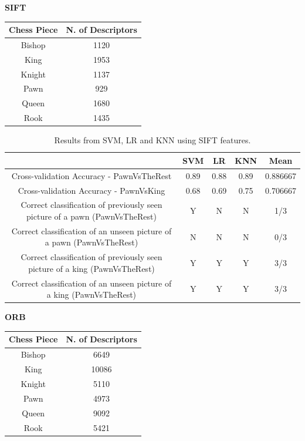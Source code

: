 \documentclass{l4proj}
\begin{document}
\begin{table}[h!] \label{SIFTTable1}
	\centering
	\textbf{SIFT}
	
	\vspace{2mm}
	\begin{tabular}{|c|c|}
	\hline
	Chess Piece & N. of Descriptors  \\
	\hline
	\rowcolor{brown!45} Bishop & 1120 \\
	King & 1953 \\
	\rowcolor{brown!45} Knight & 1137 \\
	Pawn & 929 \\
	\rowcolor{brown!45} Queen & 1680 \\
	Rook & 1435 \\
	\hline
	\end{tabular}
\end{table}



\begin{table}[h!] \label{SIFTTable2}
	\centering
	\begin{tabular}{|c|c|c|c|c|} 
	\hline
	 & SVM & LR & KNN & Mean  \\
	\hline
	\rowcolor{brown!45} Cross-validation Accuracy - PawnVsTheRest & 0.89 & 0.88 & 0.89 & 0.886667 \\
	Cross-validation Accuracy - PawnVsKing & 0.68 & 0.69 & 0.75 & 0.706667\\
	\rowcolor{brown!45} Correct classification of previously seen picture of a pawn (PawnVsTheRest) & Y & N & N & 1/3 \\
	Correct classification of an unseen picture of a pawn (PawnVsTheRest) & N & N & N & 0/3 \\
	\rowcolor{brown!45} Correct classification of previously seen picture of a king (PawnVsTheRest) & Y & Y & Y & 3/3 \\
	Correct classification of an unseen picture of a king (PawnVsTheRest) & Y & Y & Y & 3/3 \\
	\hline
	\end{tabular}
	\caption{Results from SVM, LR and KNN using SIFT features.}
\end{table}

	

\begin{table}[h!] \label{ORBTable1}
	\centering
	\vspace{10mm}
	\textbf{ORB}
	
	\vspace{2mm}
	\begin{tabular}{|c|c|} 
	\hline
	Chess Piece & N. of Descriptors  \\
	\hline
	\rowcolor{brown!45} Bishop & 6649 \\
	King & 10086 \\
	\rowcolor{brown!45} Knight & 5110 \\
	Pawn & 4973 \\
	\rowcolor{brown!45} Queen & 9092 \\
	Rook & 5421 \\
	\hline
	\end{tabular}
\end{table}
\end{document}

